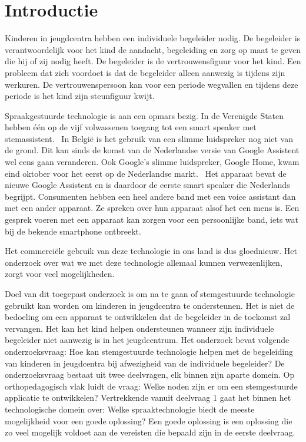 \section{Introductie} %
\label{sec:introductie}
Kinderen in jeugdcentra hebben een individuele begeleider nodig. De begeleider is verantwoordelijk voor het kind de aandacht, begeleiding en zorg op maat te geven die hij of zij nodig heeft. De begeleider is de vertrouwensfiguur voor het kind.
Een probleem dat zich voordoet is dat de begeleider alleen aanwezig is tijdens zijn werkuren. De vertrouwenspersoon kan voor een periode wegvallen en tijdens deze periode is het kind zijn steunfiguur kwijt.

Spraakgestuurde technologie is aan een opmars bezig. In de Verenigde Staten hebben één op de vijf volwassenen toegang tot een smart speaker met stemassistent.~\autocite{Passies2018} In België is het gebruik van een slimme luidspreker nog niet van de grond. Dit kan sinds de komst van de Nederlandse versie van Google Assistent wel eens gaan veranderen. Ook Google's slimme luidspreker, Google Home, kwam eind oktober voor het eerst op de Nederlandse markt.~\autocite{Haenen2018} Het apparaat bevat de nieuwe Google Assistent en is daardoor de eerste smart speaker die Nederlands begrijpt. Consumenten hebben een heel andere band met een voice assistant dan met een ander apparaat. Ze spreken over hun apparaat alsof het een mens is.\autocite{Schueler2018} Een gesprek voeren met een apparaat kan zorgen voor een persoonlijke band, iets wat bij de bekende smartphone ontbreekt.

Het commerciële gebruik van deze technologie in ons land is dus gloednieuw. Het onderzoek over wat we met deze technologie allemaal kunnen verwezenlijken, zorgt voor veel mogelijkheden.

Doel van dit toegepast onderzoek is om na te gaan of stemgestuurde technologie gebruikt kan worden om kinderen in jeugdcentra te ondersteunen. Het is niet de bedoeling om een apparaat te ontwikkelen dat de begeleider in de toekomst zal vervangen. Het kan het kind helpen ondersteunen wanneer zijn individuele begeleider niet aanwezig is in het jeugdcentrum.
Het onderzoek bevat volgende onderzoeksvraag: Hoe kan stemgestuurde technologie helpen met de begeleiding van kinderen in jeugdcentra bij afwezigheid van de individuele begeleider? 
De onderzoeksvraag bestaat uit twee deelvragen, elk binnen zijn aparte domein. Op orthopedagogisch vlak luidt de vraag: Welke noden zijn er om een stemgestuurde applicatie te ontwikkelen? Vertrekkende vanuit deelvraag 1 gaat het binnen het technologische domein over: Welke spraaktechnologie biedt de meeste mogelijkheid voor een goede oplossing? Een goede oplossing is een oplossing die zo veel mogelijk voldoet aan de vereisten die bepaald zijn in de eerste deelvraag. 

